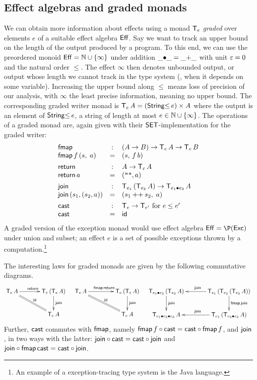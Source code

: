\documentclass[acmsmall,review,anonymous]{acmart}\settopmatter{printfolios=true,printccs=false,printacmref=false}
\begin{document}
\subsection{Effect algebras and graded monads}

We can obtain more information about effects using a monad $\T[e]$
\emph{graded} over elements $e$ of a suitable effect algebra $\Eff$.
Say we want to track an upper bound on the length of the output
produced by a program.  To this end, we can use the preordered monoid
$\Eff = \bN \cup \{\infty\}$ under addition $\_{\bu}\_ = \_{+}\_$
with unit $\Ge = 0$ and the
natural order $\leq$.  The effect $\infty$ then denotes unbounded output, or
output whose length we cannot track in the type system (\eg, when it
depends on some variable).  Increasing the upper bound along $\leq$
means loss of precision of our analysis, with $\infty$ the least
precise information, meaning no upper bound.  The corresponding graded
writer monad is $\T[e]\,A = (\StringLe e) \times A$ where the output is an
element of $\StringLe e$, a string of length at most $e \in \bN \cup
\{\infty\}$.  The operations of a graded monad are, again given with
their $\SET$-implementation for the graded writer:
\[
\begin{array}{lcl}
\tfmap & : & (A \to B) \to \T[e]\,A \to \T[e]\,B \\
\tfmap\, f\, (s,\; a) & = & (s,\, f\, b)
\\[1ex]
\treturn & : & A \to \T[\Ge]\,A \\
\treturn\, a & = & (\verb|""|, a)
\\[1ex]
\tjoin & : & \T[e_1]\,(\T[e_2]\,A) \to \T[e_1 \bu e_2]\,A \\
\tjoin\,(s_1,(s_2,a)) & = & (s_1 \append s_2,\; a)
\\[1ex]
\tcast & : & \T[e] \to \T[e'] \mbox{ for } e \leq e'\\
\tcast & = & \tid \\
\end{array}
\]
A graded version of the exception monad would use effect algebra
$\Eff = \P(\Exc)$ under union and subset; an effect $e$ is a set of
possible exceptions thrown by a computation.\footnote{An example of a
  exception-tracing type system is the Java language.}

The interesting laws for graded monads are given by the following
commutative diagrams.
\[
\xymatrix@C=8ex{
  \T[e]\,A     \ar[r]^{\treturn} \ar@{=}[dr]^{\tid}
& \T[\Ge]\,(\T[e]\,A) \ar[d]^{\tjoin}
\\
& \T[e]\,A
}
\quad
\xymatrix@C=10ex{
  \T[e]\,A     \ar[r]^{\tfmap\,\treturn} \ar@{=}[dr]^{\tid}
& \T[e]\,(\T[\Ge]\,A) \ar[d]^{\tjoin}
\\
& \T[e]\,A
}
\quad
\xymatrix@C=8ex{
  \T[e_1 \bu e_2]\,(\T[e_3]\,A) \ar[d]^{\tjoin}
& \T[e_1]\,(\T[e_2]\,(\T[e_3]\,A)) \ar[l]_{\tjoin} \ar[d]^{\tfmap\,\tjoin}
\\
  \T[e_1 \bu e_2 \bu e_3]\,A
& \T[e_1]\,(\T[e_2 \bu e_3]\,A) \ar[l]_{\tjoin}
}
\]
Further, $\tcast$ commutes with $\tfmap$, namely $\tfmap\,f \circ
\tcast = \tcast \circ \tfmap\,f$, and $\tjoin$, in two ways with
the latter: $\tjoin \circ \tcast = \tcast \circ \tjoin$ and $\tjoin
\circ \tfmap\,\tcast = \tcast \circ \tjoin$.
\end{document}
